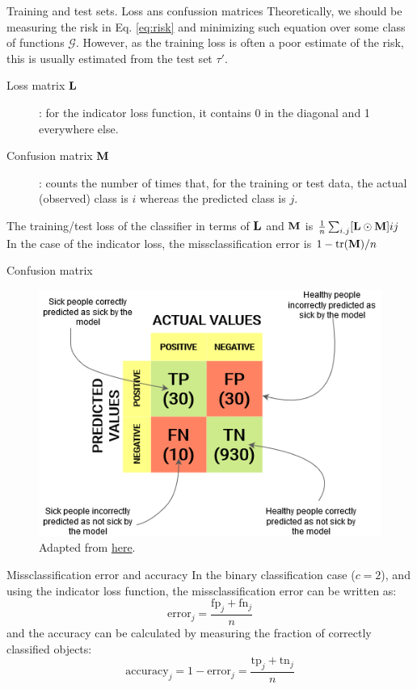 \documentclass{beamer}
\begin{document}
\begin{frame}{Training and test sets. Loss ans confussion matrices}
  Theoretically, we should be measuring the risk in Eq. \ref{eq:risk} and minimizing such equation over some class of functions $\mathcal{G}$. However, as the training loss is often a poor estimate of the risk, this is usually estimated from the test set $\tau'$.
  \begin{description}
    \item[Loss matrix $\textbf{L}$]: for the indicator loss function, it contains 0 in the diagonal and 1 everywhere else.
    \item[Confusion matrix $\textbf{M}$]: counts the number of times that, for the training or test data, the actual (observed) class is $i$ whereas the predicted class is $j$. 
  \end{description}
  The training/test loss of the classifier in terms of $\textbf{L}$ and $\textbf{M}$ is 
  $\frac{1}{n}\sum_{i.j}[\textbf{L}\odot\textbf{M}]{ij}$
  In the case of the indicator loss, the missclassification error is $1-\tr(\textbf{M})/n$
\end{frame}

\begin{frame}{Confusion matrix}
 \begin{figure}
    \includegraphics[width=0.7\linewidth]{Example-Confusion-matrix}
    \caption{Adapted from \href{https://www.analyticsvidhya.com/blog/2020/04/confusion-matrix-machine-learning/}{here}.}
 \end{figure}
\end{frame}

\begin{frame}{Missclassification error and accuracy}
  In the binary classification case ($c=2$), and using the indicator loss function, the missclassification error can be written as:
  \[
    \mathrm{error}_j = \frac{\mathrm{fp}_j+\mathrm{fn}_j}{n}  
  \]
  and the accuracy can be calculated by measuring the fraction of correctly classified objects:
  \[
    \mathrm{accuracy}_j = 1 -   \mathrm{error}_j = \frac{\mathrm{tp}_j+\mathrm{tn}_j}{n}
  \]
\end{frame}
\end{document}
